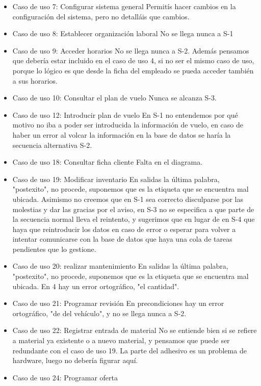 \documentclass[11pt, a4paper, twoside, titlepage]{article}
\begin{document}
\begin{itemize}
\begin{itemize}
\begin{itemize}
							\item Caso de uso 7: Configurar sistema general 
								Permitís hacer cambios en la configuración del sistema, pero no detalláis que cambios.
							\item Caso de uso 8: Establecer organización laboral 
								No se llega nunca a S-1
							\item Caso de uso 9: Acceder horarios 
								No se llega nunca a S-2. Además pensamos que debería estar incluido en el caso de uso 4, si no ser el mismo caso de uso, porque lo lógico es que desde la ficha del empleado se pueda acceder también a sus horarios.
							\item Caso de uso 10: Consultar el plan de vuelo 
								Nunca se alcanza S-3.
							\item Caso de uso 12: Introducir plan de vuelo 
								En S-1 no entendemos por qué motivo no iba a poder ser introducida la información de vuelo, en caso de haber un error al volcar la información en la base de datos se haría la secuencia alternativa S-2.
							\item Caso de uso 18: Consultar ficha cliente 
								Falta en el diagrama.
							\item Caso de uso 19: Modificar inventario 
								En salidas la última palabra, "postexito", no procede, suponemos que es la etiqueta que se encuentra mal ubicada. Asimismo no creemos que en S-1 sea correcto disculparse por las molestias y dar las gracias por el aviso, en 	S-3 no se especifica a que parte de la secuencia normal lleva el reintento, y sugerimos que en lugar de en S-4 que haya que reintroducir los datos en caso de error o esperar para volver a intentar comunicarse con la base de datos que haya una cola de tareas pendientes que lo gestione.
							\item Caso de uso 20: realizar mantenimiento 
								En salidas la última palabra, "postexito", no procede, suponemos que es la etiqueta que se encuentra mal ubicada. En 4 hay un error ortográfico, "el cantidad".
							\item Caso de uso 21: Programar revisión 
								En precondiciones hay un error ortográfico, "de del vehículo", y no se llega nunca a S-2.
							\item Caso de uso 22: Registrar entrada de material 
								No se entiende bien si se refiere a material ya existente o a nuevo material, y pensamos que puede ser redundante con el caso de uso 19. La parte del adhesivo es un problema de hardware, luego no debería figurar aquí.
							\item Caso de uso 24: Programar oferta 

\end{itemize}
\end{itemize}
\end{itemize}
\end{document}
